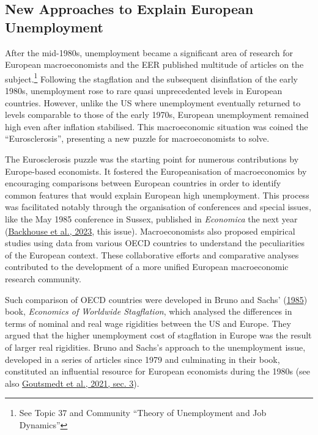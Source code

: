 \documentclass[
  12pt,
  onecolumn]{article}
\begin{document}
\hypertarget{unemployment}{%
\subsection{New Approaches to Explain European Unemployment}\label{unemployment}}

After the mid-1980s, unemployment became a significant area of research for European macroeconomists and the EER published multitude of articles on the subject.\footnote{See Topic 37 and Community ``Theory of Unemployment and Job Dynamics''} Following the stagflation and the subsequent disinflation of the early 1980s, unemployment rose to rare quasi unprecedented levels in European countries. However, unlike the US where unemployment eventually returned to levels comparable to those of the early 1970s, European unemployment remained high even after inflation stabilised. This macroeconomic situation was coined the ``Eurosclerosis'', presenting a new puzzle for macroeconomists to solve.

The Eurosclerosis puzzle was the starting point for numerous contributions by Europe-based economists. It fostered the Europeanisation of macroeconomics by encouraging comparisons between European countries in order to identify common features that would explain European high unemployment. This process was facilitated notably through the organisation of conferences and special issues, like the May 1985 conference in Sussex, published in \emph{Economica} the next year (\protect\hyperlink{ref-backhouse2023}{Backhouse et al., 2023}, this issue). Macroeconomists also proposed empirical studies using data from various OECD countries to understand the peculiarities of the European context. These collaborative efforts and comparative analyses contributed to the development of a more unified European macroeconomic research community.

Such comparison of OECD countries were developed in Bruno and Sachs' (\protect\hyperlink{ref-brunosachs1985}{1985}) book, \emph{Economics of Worldwide Stagflation}, which analysed the differences in terms of nominal and real wage rigidities between the US and Europe. They argued that the higher unemployment cost of stagflation in Europe was the result of larger real rigidities. Bruno and Sachs's approach to the unemployment issue, developed in a series of articles since 1979 and culminating in their book, constituted an influential resource for European economists during the 1980s (see also \protect\hyperlink{ref-goutsmedt2021}{Goutsmedt et al., 2021, sec. 3}).
\end{document}
